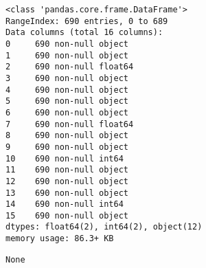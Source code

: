 \documentclass[11pt]{article}
\begin{document}
    
    \begin{Verbatim}[commandchars=\\\{\}]
<class 'pandas.core.frame.DataFrame'>
RangeIndex: 690 entries, 0 to 689
Data columns (total 16 columns):
0     690 non-null object
1     690 non-null object
2     690 non-null float64
3     690 non-null object
4     690 non-null object
5     690 non-null object
6     690 non-null object
7     690 non-null float64
8     690 non-null object
9     690 non-null object
10    690 non-null int64
11    690 non-null object
12    690 non-null object
13    690 non-null object
14    690 non-null int64
15    690 non-null object
dtypes: float64(2), int64(2), object(12)
memory usage: 86.3+ KB

    \end{Verbatim}

    
    \begin{verbatim}
None
    \end{verbatim}

    
    
\end{document}
